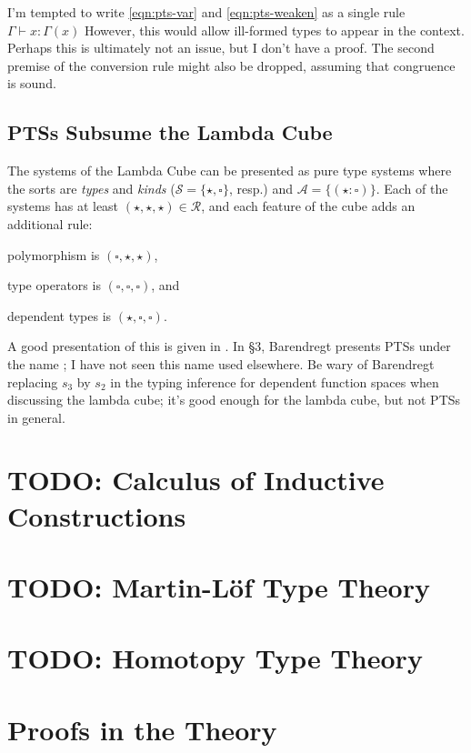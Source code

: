 \documentclass[11pt]{article} %
\theoremstyle{definition}
\theoremstyle{remark}
\begin{document}
I'm tempted to write \ref{eqn:pts-var} and \ref{eqn:pts-weaken} as a single rule
  $\Gamma \vdash x : \Gamma(x)$
However, this would allow ill-formed types to appear in the context.
Perhaps this is ultimately not an issue, but I don't have a proof.
The second premise of the conversion rule might also be dropped, assuming that congruence is sound.

\subsection{PTSs Subsume the Lambda Cube}
The systems of the Lambda Cube can be presented as pure type systems where the sorts are \textit{types} and \textit{kinds} ($\mathcal S = \{\star, \square\}$, resp.) and $\mathcal A = \{(\star : \square)\}$.
Each of the systems has at least $(\star, \star, \star) \in \mathcal R$, and each feature of the cube adds an additional rule:
\begin{enumerate*}[label=\textit{\roman*})]
\item polymorphism is $(\square,\star,\star)$,
\item type operators is $(\square,\square,\square)$, and
\item dependent types is $(\star,\square,\square)$.
\end{enumerate*}

A good presentation of this is given in \cite{barendregt_1991}.
In \S3, Barendregt presents PTSs under the name ; I have not seen this name used elsewhere.
Be wary of Barendregt replacing $s_3$ by $s_2$ in the typing inference for dependent function spaces when discussing the lambda cube; it's good enough for the lambda cube, but not PTSs in general.

\section{TODO: Calculus of Inductive Constructions}
\section{TODO: Martin-L\"of Type Theory}
\section{TODO: Homotopy Type Theory}

\section{Proofs in the Theory}
\end{document}
